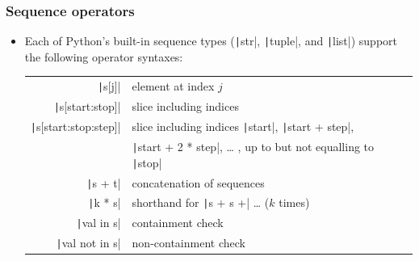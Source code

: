 \begin{frame}
    \frametitle{Sequence operators}

    \begin{itemize}
        \item Each of Python's built-in sequence types (\texttt|str|, \texttt|tuple|, and \texttt|list|) support the following operator syntaxes:
              \begin{table}[htbp]
                  \centering
                  \begin{tabular}{rl}
                      \texttt|s[j]|               & element at index $j$                                                                            \\
                      \texttt|s[start:stop]|      & slice including indices                                                                         \\
                      \texttt|s[start:stop:step]| & slice including indices \texttt|start|, \texttt|start + step|,          \\
                                                              & \texttt|start + 2 * step|, … , up to but not equalling to \texttt|stop| \\
                      \texttt|s + t|              & concatenation of sequences                                                                      \\
                      \texttt|k * s|              & shorthand for \texttt|s + s +| … ($k$ times)                                        \\
                      \texttt|val in s|           & containment check                                                                               \\
                      \texttt|val not in s|       & non-containment check                                                                           \\
                  \end{tabular}%
              \end{table}%

    \end{itemize}

\end{frame}

